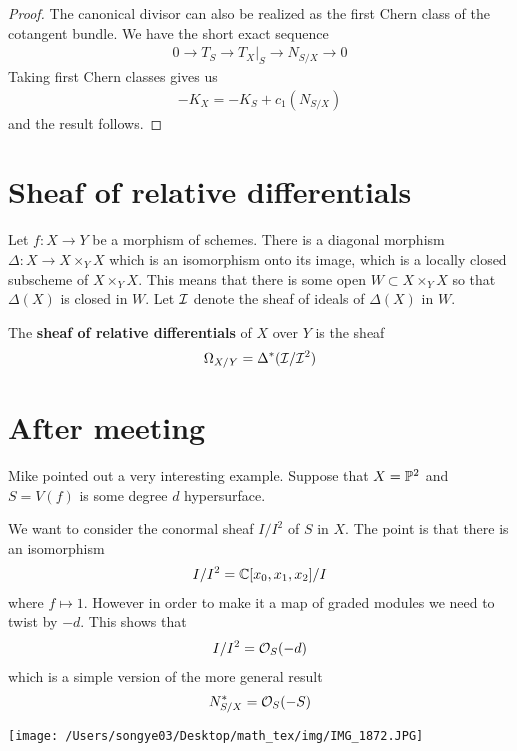\documentclass[12pt]{article}
\begin{document}
\begin{proof}
    The canonical divisor can also be realized as the first Chern class of the cotangent bundle. We have the short exact sequence
    \begin{align*}
        0 \to T_S \to T_X\vert_S \to N_{S/X}\to 0
    \end{align*}
    Taking first Chern classes gives us \begin{align*}
        -K_X = -K_S + c_1(N_{S/X})
    \end{align*}
    and the result follows.
\end{proof}

\section{Sheaf of relative differentials}
Let $f:X\to Y$ be a morphism of schemes. There is a diagonal morphism $\Delta:X\to X\times_Y X$ which is an
isomorphism onto its image, which is a locally closed subscheme of $X\times_Y X$. This means that there is 
some open $W\subset X\times_Y X$ so that $\Delta(X)$ is closed in $W$. Let $\cI$ denote the
sheaf of ideals of $\Delta(X)$ in $W$.

\begin{definition}
    The \textbf{sheaf of relative differentials} of $X$ over $Y$ is the sheaf \begin{align*}
        \Omega_{X/Y} = \Delta^*(\cI/\cI^2)
    \end{align*}
\end{definition}

\section{After meeting}
Mike pointed out a very interesting example.
Suppose that $X = \P^2$ and $S = V(f)$ is some degree $d$ hypersurface.

We want to consider the conormal sheaf $I/I^2$ of $S$ in $X$. The point is that there is an isomorphism \begin{align*}
    I/I^2 = \C[x_0,x_1,x_2]/I
\end{align*} where $f \mapsto 1$. However in order to make it a map of graded modules we need to
twist by $-d$. This shows that \begin{align*}
    I/I^2 = \cO_S(-d)
\end{align*} which is a simple version of the more general result \begin{align*}
    N_{S/X}^* = \cO_S(-S)
\end{align*}
\begin{center}
    \texttt{[image: /Users/songye03/Desktop/math\_tex/img/IMG\_1872.JPG]}
\end{center}
\end{document}
